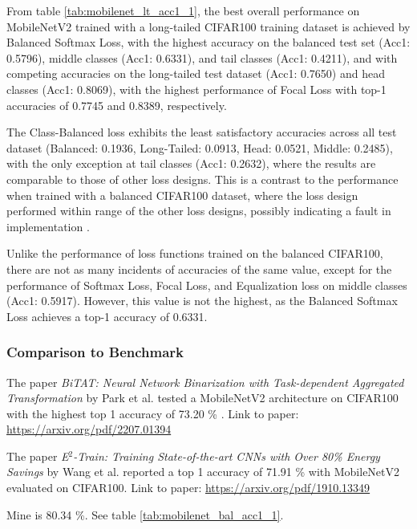 
From table \ref{tab:mobilenet_lt_acc1_1}, the best overall performance on MobileNetV2 trained with a long-tailed CIFAR100 training dataset is achieved by Balanced Softmax Loss, with the highest accuracy on the balanced test set (Acc1: 0.5796), middle classes (Acc1: 0.6331), and tail classes (Acc1: 0.4211), and with competing accuracies on the long-tailed test dataset (Acc1: 0.7650) and head classes (Acc1: 0.8069), with the highest performance of Focal Loss with top-1 accuracies of 0.7745 and 0.8389, respectively.

The Class-Balanced loss exhibits the least satisfactory accuracies across all test dataset (Balanced: 0.1936, Long-Tailed: 0.0913, Head: 0.0521, Middle: 0.2485), with the only exception at tail classes (Acc1: 0.2632), where the results are comparable to those of other loss designs. This is a contrast to the performance when trained with a balanced CIFAR100 dataset, where the loss design performed within range of the other loss designs, possibly indicating a fault in implementation .

Unlike the performance of loss functions trained on the balanced CIFAR100, there are not as many incidents of accuracies of the same value, except for the performance of Softmax Loss, Focal Loss, and Equalization loss on middle classes (Acc1: 0.5917). However, this value is not the highest, as the Balanced Softmax Loss achieves a top-1 accuracy of 0.6331. 

\subsubsection{Comparison to Benchmark}
The paper \textit{BiTAT: Neural Network Binarization
with Task-dependent Aggregated Transformation} by Park et al. tested a MobileNetV2 architecture on CIFAR100 with the highest top 1 accuracy of 73.20 \% .
Link to paper: \url{https://arxiv.org/pdf/2207.01394}

The paper \textit{E$^2$-Train: Training State-of-the-art CNNs with Over
80\% Energy Savings} by Wang et al. reported a top 1 accuracy of 71.91 \% with MobileNetV2 evaluated on CIFAR100.
Link to paper: \url{https://arxiv.org/pdf/1910.13349}

Mine is 80.34 \%. See table \ref{tab:mobilenet_bal_acc1_1}.

